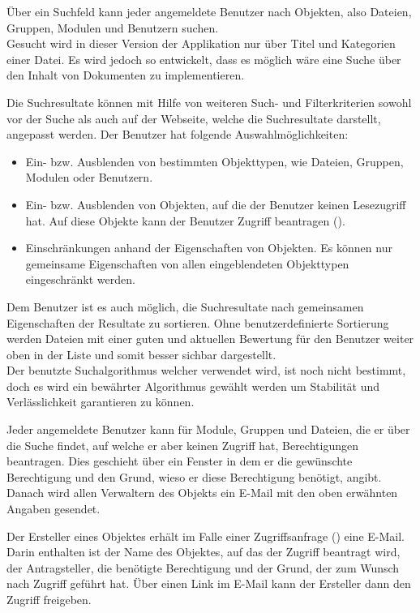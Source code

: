 Über ein Suchfeld kann jeder angemeldete Benutzer nach Objekten, also Dateien, Gruppen, Modulen und Benutzern suchen.\\
Gesucht wird in dieser Version der Applikation nur über Titel und Kategorien einer Datei. Es wird jedoch so entwickelt, dass es möglich wäre eine Suche über den Inhalt von Dokumenten zu implementieren.

Die Suchresultate können mit Hilfe von weiteren Such- und Filterkriterien sowohl vor der Suche als auch auf der Webseite, welche die Suchresultate darstellt, angepasst werden. Der Benutzer hat folgende Auswahlmöglichkeiten:
\begin{itemize}
\item Ein- bzw. Ausblenden von bestimmten Objekttypen, wie Dateien, Gruppen, Modulen oder Benutzern.
\item Ein- bzw. Ausblenden von Objekten, auf die der Benutzer keinen Lesezugriff hat. Auf diese Objekte kann der Benutzer Zugriff beantragen (). 
\item Einschränkungen anhand der Eigenschaften von Objekten. Es können nur gemeinsame Eigenschaften von allen eingeblendeten Objekttypen eingeschränkt werden.
\end{itemize}
Dem Benutzer ist es auch möglich, die Suchresultate nach gemeinsamen Eigenschaften der Resultate zu sortieren. Ohne benutzerdefinierte Sortierung werden Dateien mit einer guten und aktuellen Bewertung für den Benutzer weiter oben in der Liste und somit besser sichbar dargestellt.\\
Der benutzte Suchalgorithmus welcher verwendet wird, ist noch nicht bestimmt, doch es wird ein bewährter Algorithmus gewählt werden um Stabilität und Verlässlichkeit garantieren zu können.

Jeder angemeldete Benutzer kann für Module, Gruppen und Dateien, die er über die Suche findet, auf welche er aber keinen Zugriff hat, Berechtigungen beantragen. Dies geschieht über ein Fenster in dem er die gewünschte Berechtigung und den Grund, wieso er diese Berechtigung benötigt, angibt. Danach wird allen Verwaltern des Objekts ein E-Mail mit den oben erwähnten Angaben gesendet.

Der Ersteller eines Objektes erhält im Falle einer Zugriffsanfrage () eine E-Mail. Darin enthalten ist der Name des Objektes, auf das der Zugriff beantragt wird, der Antragsteller, die benötigte Berechtigung und der Grund, der zum Wunsch nach Zugriff geführt hat. Über einen Link im E-Mail kann der Ersteller dann den Zugriff freigeben.
